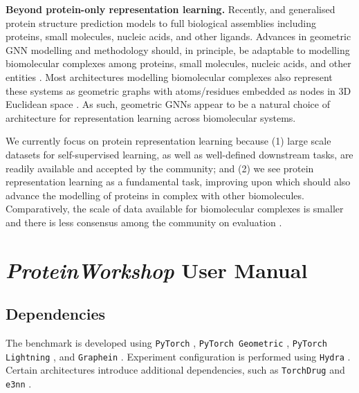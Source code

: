 \textbf{Beyond protein-only representation learning. }
Recently, \citet{krishna2023generalized} and \citet{deepmind2023alphafold} generalised protein structure prediction models to full biological assemblies including proteins, small molecules, nucleic acids, and other ligands.
Advances in geometric GNN modelling and methodology should, in principle, be adaptable to modelling biomolecular complexes among proteins, small molecules, nucleic acids, and other entities \citep{morehead2023towards}.
Most architectures modelling biomolecular complexes also represent these systems as geometric graphs with atoms/residues embedded as nodes in 3D Euclidean space \citep{corso2023diffdock, schneuing2022structure}. 
As such, geometric GNNs appear to be a natural choice of architecture for representation learning across biomolecular systems.

We currently focus on protein representation learning because (1) large scale datasets for self-supervised learning, as well as well-defined downstream tasks, are readily available and accepted by the community; and (2) we see protein representation learning as a fundamental task, improving upon which should also advance the modelling of proteins in complex with other biomolecules. 
Comparatively, the scale of data available for biomolecular complexes is smaller and there is less consensus among the community on evaluation \citep{harris2023posecheck, buttenschoen2023posebusters}.


\section{\emph{ProteinWorkshop} User Manual}
\label{app:benchmark}

\subsection{Dependencies}
The benchmark is developed using \texttt{PyTorch} \citep{NEURIPS2019_9015}, \texttt{PyTorch Geometric} \citep{fey2019fast}, \texttt{PyTorch Lightning} \citep{falcon2019pytorch}, and \texttt{Graphein} \citep{jamasb2022graphein}. Experiment configuration is performed using \texttt{Hydra} \citep{Yadan2019Hydra}. Certain architectures introduce additional dependencies, such as \texttt{TorchDrug} \citep{zhu2022torchdrug} and \texttt{e3nn} \citep{geiger2022e3nn}.

